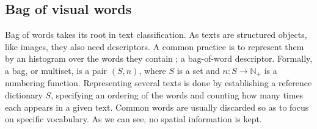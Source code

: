 \documentclass[a4paper]{report}
\begin{document}
\subsection{\label{subsec:BagOfVisualWord}Bag of visual words}
Bag of words takes its root in text classification. As texts are structured objects, like images, they also need descriptors. A common practice is to represent them by an histogram over the words they contain ; a bag-of-word descriptor. Formally, a bag, or multiset, is a pair $(S, n)$, where $S$ is a set and $n : S \rightarrow \mathbb{N}_+$ is a numbering function. Representing several texts is done by establishing a reference dictionary $S$, specifying an ordering of the words and counting how many times each appears in a given text. Common words are usually discarded so as to focus on specific vocabulary. As we can see, no spatial information is kept.
\end{document}
